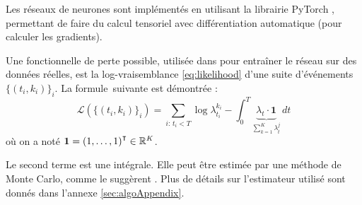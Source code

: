 \documentclass[../main.tex]{subfiles}
\begin{document}
	
Les réseaux de neurones sont implémentés en utilisant la librairie \textsf{PyTorch} \cite{paszke2017automatic}, permettant de faire du calcul tensoriel avec différentiation automatique (pour calculer les gradients).

Une fonctionnelle de perte possible, utilisée dans \autocite{meiEisnerNeuralHawkes} pour entraîner le réseau sur des données réelles, est la log-vraisemblance \eqref{eq:likelihood} d'une suite d'événements $\{(t_i,k_i)\}_i$. La formule\footnotemark~suivante est démontrée \cite[15]{meiEisnerNeuralHawkes}: 
\begin{equation}\label{eq:explicitLikelihood}
\mathcal{L}\left(\{(t_i,k_i)\}_i\right)
=
\sum_{i:\, t_i < T} \log\lambda^{k_i}_{t_i} - \int_0^T \underbrace{\lambda_t\cdot\mathbf{1}}_{\sum_{k=1}^K\lambda^j_t}\,dt
\end{equation}
où on a noté $\mathbf{1} = {(1,\ldots,1)}^\intercal\in\mathbb{R}^K$.


Le second terme est une intégrale. Elle peut être estimée par une méthode de Monte Carlo, comme le suggèrent \citeauthor{meiEisnerNeuralHawkes}. Plus de détails sur l'estimateur utilisé sont donnés dans l'annexe \autoref{sec:algoAppendix}.
\end{document}
